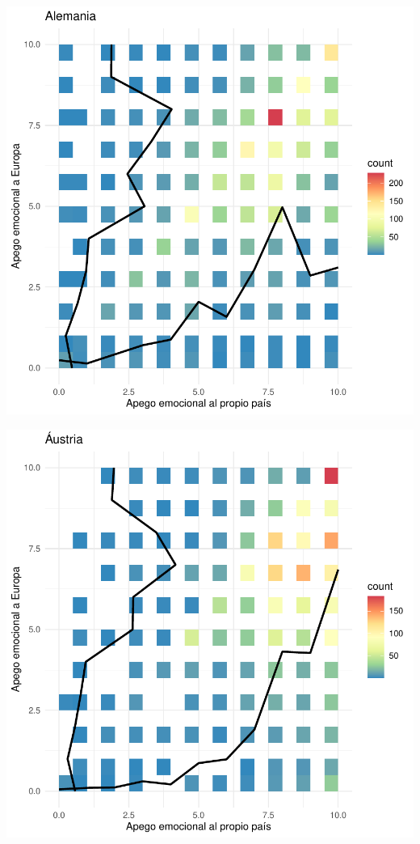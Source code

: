 \documentclass{article}
\begin{document}
\includegraphics{Informe-012}

\includegraphics{Informe-013}
\end{document}
